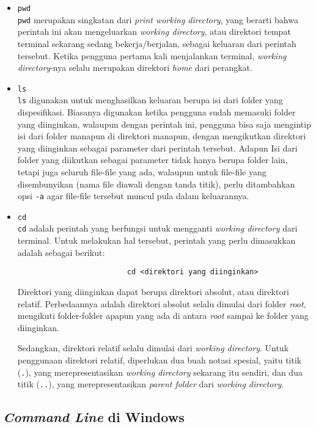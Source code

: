 \begin{itemize}
	\item \verb|pwd|\\
	\verb|pwd| merupakan singkatan dari \textit{print working directory}, yang berarti bahwa perintah ini akan mengeluarkan \textit{working directory}, atau direktori tempat terminal sekarang sedang bekerja/berjalan, sebagai keluaran dari perintah tersebut. Ketika pengguna pertama kali menjalankan terminal, \textit{working directory}-nya selalu merupakan direktori \textit{home} dari perangkat.
	\item \verb|ls|\\
	\verb|ls| digunakan untuk menghasilkan keluaran berupa isi dari folder yang dispesifikasi. Biasanya digunakan ketika pengguna sudah memasuki folder yang diinginkan, walaupun dengan perintah ini, pengguna bisa saja mengintip isi dari folder manapun di direktori manapun, dengan mengikutkan direktori yang diinginkan sebagai parameter dari perintah tersebut. Adapun Isi dari folder yang diikutkan sebagai parameter tidak hanya berupa folder lain, tetapi juga seluruh file-file yang ada, walaupun untuk file-file yang disembunyikan (nama file diawali dengan tanda titik), perlu ditambahkan opsi \verb|-a| agar file-file tersebut muncul pula dalam keluarannya.
	\item \verb|cd|\\
	\verb|cd| adalah perintah yang berfungsi untuk mengganti \textit{working directory} dari terminal. Untuk melakukan hal tersebut, perintah yang perlu dimasukkan adalah sebagai berikut:
	
	\begin{verbatim}
	                     cd <direktori yang diinginkan>
	\end{verbatim}
	
	Direktori yang diinginkan dapat berupa direktori absolut, atau direktori relatif. Perbedaannya adalah direktori absolut selalu dimulai dari folder \textit{root}, mengikuti folder-folder apapun yang ada di antara \textit{root} sampai ke folder yang diinginkan.
	
	Sedangkan, direktori relatif selalu dimulai dari \textit{working directory}. Untuk penggunaan direktori relatif, diperlukan dua buah notasi spesial, yaitu titik (\verb|.|), yang merepresentasikan \textit{working directory} sekarang itu sendiri, dan dua titik (\verb|..|), yang merepresentasikan \textit{parent folder} dari \textit{working directory}.
\end{itemize}

\subsection{\textit{Command Line} di Windows}
\label{sec:commandline-windows}

